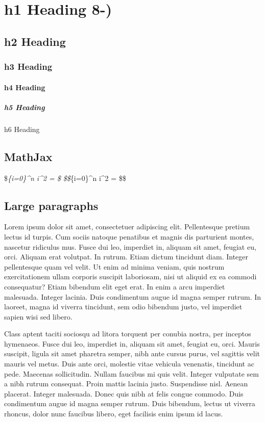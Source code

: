\documentclass[]{article}
\date{}
\let\oldparagraph\paragraph
\renewcommand{\paragraph}[1]{\oldparagraph{#1}\mbox{}}
\let\oldsubparagraph\subparagraph
\renewcommand{\subparagraph}[1]{\oldsubparagraph{#1}\mbox{}}
\begin{document}
\section{h1 Heading 8-)}\label{h1-heading-8-}

\subsection{h2 Heading}\label{h2-heading}

\subsubsection{h3 Heading}\label{h3-heading}

\paragraph{h4 Heading}\label{h4-heading}

\subparagraph{h5 Heading}\label{h5-heading}

h6 Heading

\subsection{MathJax}\label{mathjax}

\$\sum\emph{\{i=0\}\^{}n i\^{}2 = \$
\$\$\sum}\{i=0\}\^{}n i\^{}2 = \$\$

\subsection{Large paragraphs}\label{large-paragraphs}

Lorem ipsum dolor sit amet, consectetuer adipiscing elit. Pellentesque
pretium lectus id turpis. Cum sociis natoque penatibus et magnis dis
parturient montes, nascetur ridiculus mus. Fusce dui leo, imperdiet in,
aliquam sit amet, feugiat eu, orci. Aliquam erat volutpat. In rutrum.
Etiam dictum tincidunt diam. Integer pellentesque quam vel velit. Ut
enim ad minima veniam, quis nostrum exercitationem ullam corporis
suscipit laboriosam, nisi ut aliquid ex ea commodi consequatur? Etiam
bibendum elit eget erat. In enim a arcu imperdiet malesuada. Integer
lacinia. Duis condimentum augue id magna semper rutrum. In laoreet,
magna id viverra tincidunt, sem odio bibendum justo, vel imperdiet
sapien wisi sed libero.

Class aptent taciti sociosqu ad litora torquent per conubia nostra, per
inceptos hymenaeos. Fusce dui leo, imperdiet in, aliquam sit amet,
feugiat eu, orci. Mauris suscipit, ligula sit amet pharetra semper, nibh
ante cursus purus, vel sagittis velit mauris vel metus. Duis ante orci,
molestie vitae vehicula venenatis, tincidunt ac pede. Maecenas
sollicitudin. Nullam faucibus mi quis velit. Integer vulputate sem a
nibh rutrum consequat. Proin mattis lacinia justo. Suspendisse nisl.
Aenean placerat. Integer malesuada. Donec quis nibh at felis congue
commodo. Duis condimentum augue id magna semper rutrum. Duis bibendum,
lectus ut viverra rhoncus, dolor nunc faucibus libero, eget facilisis
enim ipsum id lacus.
\end{document}
